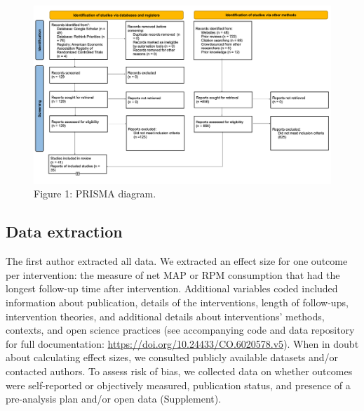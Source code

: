 \documentclass[preprint, 3p,
authoryear]{elsarticle} %
\begin{document}
\begin{figure}[H]

{\centering \includegraphics[width=1.2\linewidth,]{./figures/prisma-diagram} 

}

\caption{Figure 1: PRISMA diagram.}\label{fig:prisma_diagram}
\end{figure}

\subsection{Data extraction}\label{sec2.3}

The first author extracted all data. We extracted an effect size for one
outcome per intervention: the measure of net MAP or RPM consumption that
had the longest follow-up time after intervention. Additional variables
coded included information about publication, details of the
interventions, length of follow-ups, intervention theories, and
additional details about interventions' methods, contexts, and open
science practices (see accompanying code and data repository for full
documentation: \url{https://doi.org/10.24433/CO.6020578.v5}). When in
doubt about calculating effect sizes, we consulted publicly available
datasets and/or contacted authors. To assess risk of bias, we collected
data on whether outcomes were self-reported or objectively measured,
publication status, and presence of a pre-analysis plan and/or open data
(Supplement).
\end{document}
